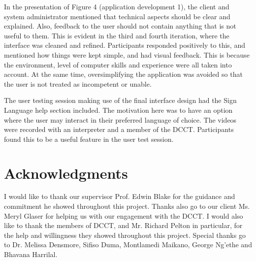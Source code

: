 \documentclass{sig-alternate-05-2015}
\begin{document}
In the presentation of Figure 4 (application development 1), the client and system administrator mentioned that technical aspects should be clear and explained. Also, feedback to the user should not contain anything that is not useful to them. This is evident in the third and fourth iteration, where the interface was cleaned and refined. Participants responded positively to this, and mentioned how things were kept simple, and had visual feedback. This is because the environment, level of computer skills and experience were all taken into account. At the same time, oversimplifying the application was avoided so that the user is not treated as incompetent or unable.

The user testing session making use of the final interface design had the Sign Language help section included. The motivation here was to have an option where the user may interact in their preferred language of choice. The videos were recorded with an interpreter and a member of the DCCT. Participants found this to be a useful feature in the user test session.

\section{Acknowledgments}
I would like to thank our supervisor Prof. Edwin Blake for the guidance and commitment he showed throughout this project. Thanks also go to our client Ms. Meryl Glaser for helping us with our engagement with the DCCT. I would also like to thank the members of DCCT, and Mr. Richard Pelton in particular, for the help and willingness they showed throughout this project. Special thanks go to Dr. Melissa Densmore, Sifiso Duma, Montlamedi Maikano, George Ng'ethe and Bhavana Harrilal.

\medskip



\end{document}
